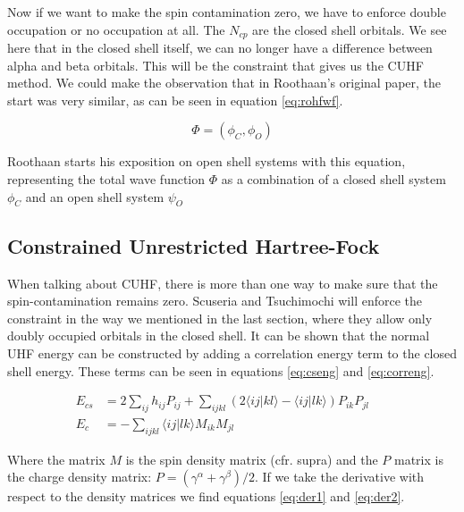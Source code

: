 \documentclass[twoside,twocolumn,9pt]{article}
\begin{document}
Now if we want to make the spin contamination zero, we have to enforce double occupation or no occupation at all. The $N_{cp}$ are the closed shell orbitals. We see here that in
the closed shell itself, we can no longer have a difference between alpha and beta orbitals. This will be the constraint that gives us the CUHF method. We could make the observation
that in Roothaan's original paper, the start was very similar, as can be seen in equation \eqref{eq:rohfwf}\cite{Roothaan1960}.

\begin{equation}\label{eq:rohfwf}
  \Phi = (\phi_C,\phi_O)
\end{equation}

Roothaan starts his exposition on open shell systems with this equation, representing the total wave function $\Phi$ as a combination of a closed shell system $\phi_C$ and 
an open shell system $\psi_O$

\subsection{Constrained Unrestricted Hartree-Fock}
\label{subsec:cuhftheory}
When talking about CUHF, there is more than one way to make sure that the spin-contamination remains zero. Scuseria and Tsuchimochi will enforce the constraint in the way
we mentioned in the last section, where they allow only doubly occupied orbitals in the closed shell\cite{Scuseria2010}. It can be shown that the normal UHF energy can be 
constructed by adding a correlation energy term to the closed shell energy. These terms can be seen in equations \eqref{eq:cseng} and \eqref{eq:correng}\cite{Savin2010}.

\begin{subequations}
  \begin{align}
    \label{eq:cseng}
    E_{cs} & = 2\sum_{ij}h_{ij}P_{ij} + \sum_{ijkl}(2\langle ij|kl\rangle - \langle ij|lk \rangle)P_{ik}P_{jl} &  & \\
    \label{eq:correng}
    E_c    & = -\sum_{ijkl}\langle ij|lk \rangle M_{ik}M_{jl}                                                  &  &
  \end{align}
\end{subequations}

Where the matrix $M$ is the spin density matrix (cfr. supra) and the $P$ matrix is the charge density matrix: $P = (\gamma^\alpha + \gamma^\beta)/2$. If we take the
derivative with respect to the density matrices we find equations \eqref{eq:der1} and \eqref{eq:der2}.
\end{document}
